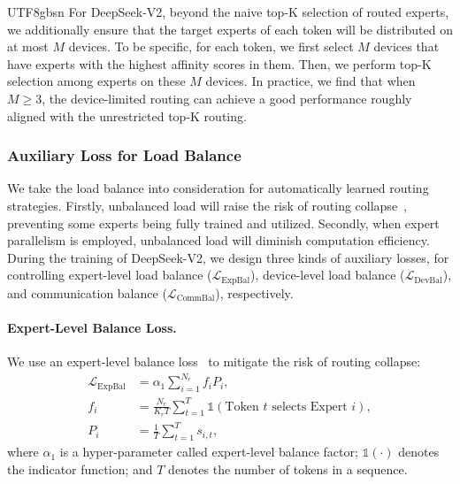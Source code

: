 \documentclass[11pt, a4paper, logo, copyright, nonumbering]{deepseek}
\newcommand{\dsvii}{DeepSeek-V2}
\renewcommand{\geq}{\geqslant}
\begin{document}
\begin{CJK*}{UTF8}{gbsn}
For \dsvii{}, beyond the naive top-K selection of routed experts, we additionally ensure that the target experts of each token will be distributed on at most $M$ devices. 
To be specific, for each token, we first select $M$ devices that have experts with the highest affinity scores in them. 
Then, we perform top-K selection among experts on these $M$ devices. 
In practice, we find that when $M \geq 3$, the device-limited routing can achieve a good performance roughly aligned with the unrestricted top-K routing. 

\subsubsection{Auxiliary Loss for Load Balance}

We take the load balance into consideration for automatically learned routing strategies. 
Firstly, unbalanced load will raise the risk of routing collapse~\citep{moe}, preventing some experts being fully trained and utilized. 
Secondly, when expert parallelism is employed, unbalanced load will diminish computation efficiency. 
During the training of \dsvii{}, we design three kinds of auxiliary losses, for controlling expert-level load balance ($\mathcal{L}_{\mathrm{ExpBal}}$), device-level load balance ($\mathcal{L}_{\mathrm{DevBal}}$), and communication balance ($\mathcal{L}_{\mathrm{CommBal}}$), respectively. 

\paragraph{Expert-Level Balance Loss.}
We use an expert-level balance loss~\citep{switch,gshard} to mitigate the risk of routing collapse:
\begin{align}
    \mathcal{L}_{\mathrm{ExpBal}} & = \alpha_1 \sum_{i=1}^{N_r}{f_i P_i}, \\
    f_i & = \frac{N_r}{K_r T} \sum_{t=1}^{T}{ \mathds{1}( \text{Token $t$ selects Expert $i$} )}, \\
    P_i & = \frac{1}{T} \sum_{t=1}^{T}{s_{i,t}},
\end{align}
where $\alpha_1$ is a hyper-parameter called expert-level balance factor; 
$\mathds{1}(\cdot)$ denotes the indicator function; 
and $T$ denotes the number of tokens in a sequence. 


\end{CJK*}
\end{document}
